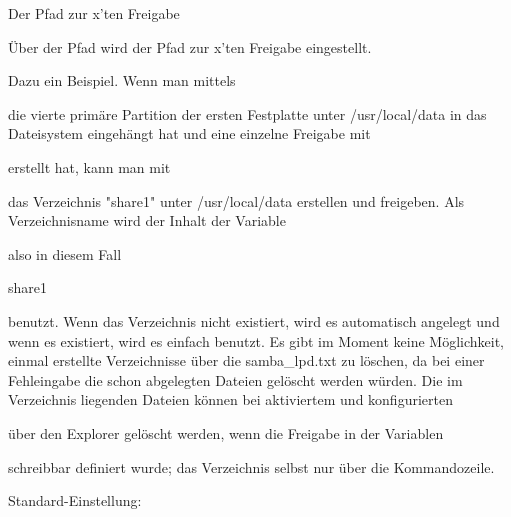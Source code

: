\begin{description}

    Der Pfad zur x'ten Freigabe

        Über  der Pfad wird der Pfad zur x'ten Freigabe
        eingestellt.

        Dazu ein Beispiel. Wenn man mittels










        die vierte primäre Partition der ersten Festplatte unter
        /usr/local/data in das Dateisystem eingehängt hat und eine
        einzelne Freigabe mit







        erstellt hat, kann man mit




        das Verzeichnis "share1" unter /usr/local/data erstellen
        und freigeben. Als Verzeichnisname wird der Inhalt der Variable


        also in diesem Fall

        share1

        benutzt. Wenn das Verzeichnis nicht existiert, wird es automatisch
        angelegt und wenn es existiert, wird es einfach benutzt.
        Es gibt im Moment keine Möglichkeit, einmal erstellte Verzeichnisse über
        die samba\_lpd.txt zu löschen, da bei einer Fehleingabe die schon abgelegten
        Dateien gelöscht werden würden.
        Die im Verzeichnis liegenden Dateien können bei aktiviertem und
        konfigurierten


        über den Explorer gelöscht werden, wenn die Freigabe in der Variablen


        schreibbar definiert wurde; das Verzeichnis selbst nur über die
        Kommandozeile.

        Standard-Einstellung: 

\end{description}

